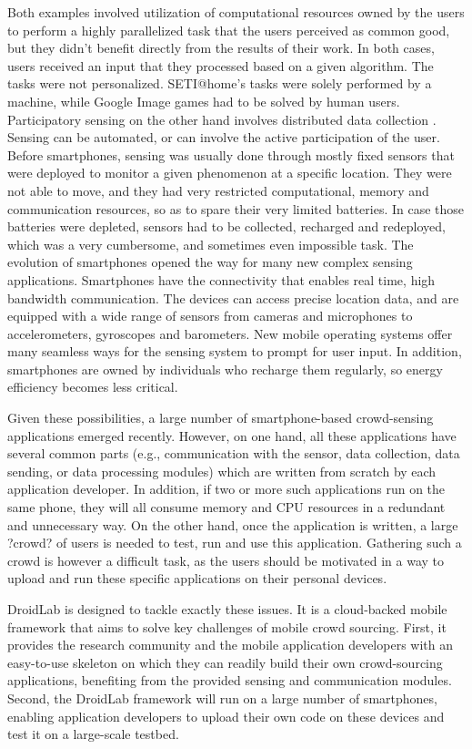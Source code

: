 \documentclass[conference,letterpaper]{IEEEtran}
\begin{document}
Both examples involved utilization of computational resources owned by the users to perform a highly parallelized task that the users perceived as common good, but they didn't benefit directly from the results of their work. In both cases, users received an input that they processed based on a given algorithm. The tasks were not personalized. SETI@home's tasks were solely performed by a machine, while Google Image games had to be solved by human users. 
Participatory sensing on the other hand involves distributed data collection . Sensing can be automated, or can involve the active participation of the user. Before smartphones, sensing was usually done through mostly fixed sensors that were deployed to monitor a given phenomenon at a specific location. They were not able to move, and they had very restricted computational, memory and communication resources, so as to spare their very limited batteries. In case those batteries were depleted, sensors had to be collected, recharged and redeployed, which was a very cumbersome, and sometimes even impossible task. The evolution of smartphones opened the way for many new complex sensing applications. Smartphones have the connectivity that enables real time, high bandwidth communication. The devices can access precise location data, and are equipped with a wide range of sensors from cameras and microphones to accelerometers, gyroscopes and barometers. New mobile operating systems offer many seamless ways for the sensing system to prompt for user input. In addition, smartphones are owned by individuals who recharge them regularly, so energy efficiency becomes less critical.

Given these possibilities, a large number of smartphone-based crowd-sensing applications emerged recently. However, on one hand, all these applications have several common parts (e.g., communication with the sensor, data collection, data sending, or data processing modules) which are written from scratch by each application developer. In addition, if two or more such applications run on the same phone, they will all consume memory and CPU resources in a redundant and unnecessary way. On the other hand, once the application is written, a large ?crowd? of users is needed to test, run and use this application. Gathering such a crowd is however a difficult task, as the users should be motivated in a way to upload and run these specific applications on their personal devices.     
 
DroidLab is designed to tackle exactly these issues. It  is a cloud-backed mobile framework  that aims to solve key challenges of mobile crowd sourcing. First, it provides the research community and the mobile application developers with an easy-to-use skeleton on which they can readily build their own crowd-sourcing applications, benefiting from the provided sensing and communication modules. Second, the DroidLab framework will run on a large number of smartphones, enabling application developers to upload their own code on these devices and test it on a large-scale testbed. 
\end{document}
